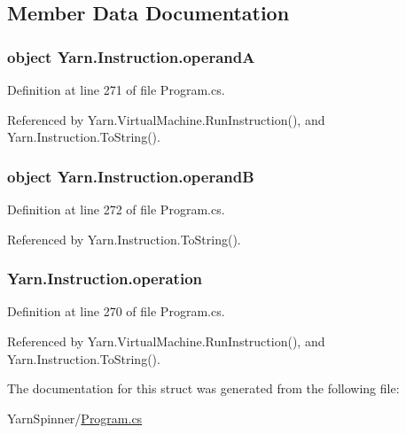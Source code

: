 \subsection{Member Data Documentation}
\hypertarget{a00121_ab5d386faa0d3dbc23db80f8e62706afd}{
\subsubsection[{operand\-A}]{\setlength{\rightskip}{0pt plus 5cm}object Yarn.\-Instruction.\-operand\-A}}\label{a00121_ab5d386faa0d3dbc23db80f8e62706afd}


Definition at line 271 of file Program.\-cs.



Referenced by Yarn.\-Virtual\-Machine.\-Run\-Instruction(), and Yarn.\-Instruction.\-To\-String().

\hypertarget{a00121_a56348c6fe7eb919b7277afc06e5b224a}{
\subsubsection[{operand\-B}]{\setlength{\rightskip}{0pt plus 5cm}object Yarn.\-Instruction.\-operand\-B}}\label{a00121_a56348c6fe7eb919b7277afc06e5b224a}


Definition at line 272 of file Program.\-cs.



Referenced by Yarn.\-Instruction.\-To\-String().

\hypertarget{a00121_a566bf5f7198cc353ea5c3710cb3a31cb}{
\subsubsection[{operation}]{ Yarn.\-Instruction.\-operation}}\label{a00121_a566bf5f7198cc353ea5c3710cb3a31cb}


Definition at line 270 of file Program.\-cs.



Referenced by Yarn.\-Virtual\-Machine.\-Run\-Instruction(), and Yarn.\-Instruction.\-To\-String().



The documentation for this struct was generated from the following file\-:\begin{DoxyCompactItemize}
\item 
Yarn\-Spinner/\hyperlink{a00317}{Program.\-cs}\end{DoxyCompactItemize}
